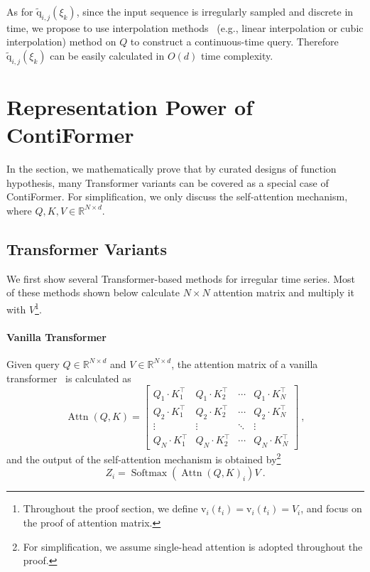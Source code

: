 As for $\tilde{\boldsymbol{\mathrm{q}}}_{i,j}(\xi_k)$, since the input sequence is irregularly sampled and discrete in time, we propose to use interpolation methods~\cite{kidger2020neural} (e.g., linear interpolation or cubic interpolation) method on $Q$ to construct a continuous-time query. Therefore $\tilde{\boldsymbol{\mathrm{q}}}_{i,j}(\xi_k)$ can be easily calculated in $O(d)$ time complexity.


\section{Representation Power of ContiFormer} \label{sec:proof}

In the section, we mathematically prove that by curated designs of function hypothesis, many Transformer variants can be covered as a special case of ContiFormer. For simplification, we only discuss the self-attention mechanism, where $Q, K, V \in \mathbb{R}^{N \times d}$.

\subsection{Transformer Variants} \label{sec:variants}

We first show several Transformer-based methods for irregular time series. Most of these methods shown below calculate $N \times N$ attention matrix and multiply it with $V$\footnote{Throughout the proof section, we define $\boldsymbol{\mathrm{v}}_i(t_i)=\boldsymbol{\mathrm{v}}_i(t_i)=V_i$, and focus on the proof of attention matrix.}. 

\paragraph{Vanilla Transformer}

Given query $Q \in \mathbb{R}^{N \times d}$ and $V \in \mathbb{R}^{N \times d}$, the attention matrix of a vanilla transformer~\cite{vaswani2017attention} is calculated as 
\begin{equation}
\operatorname{Attn}(Q, K)=\left[\begin{array}{cccc}
Q_1 \cdot K_1^\top & Q_1 \cdot K_2^\top & \cdots & Q_1 \cdot K_N^\top \\
Q_2 \cdot K_1^\top & Q_2 \cdot K_2^\top & \cdots & Q_2 \cdot K_N^\top \\
\vdots & \vdots & \ddots & \vdots \\
Q_N \cdot K_1^\top & Q_N \cdot K_2^\top & \cdots & Q_N \cdot K_N^\top
\end{array}\right] ~,
\end{equation}
and the output of the self-attention mechanism is obtained by\footnote{For simplification, we assume single-head attention is adopted throughout the proof.}
\begin{equation}
Z_i = \operatorname{Softmax}(\operatorname{Attn}(Q, K)_i) V ~.
\end{equation}


